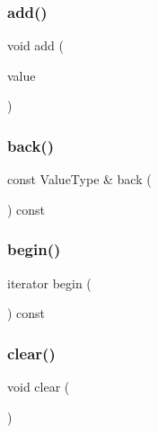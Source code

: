 \subsubsection{\texorpdfstring{add()}{add()}}
{\footnotesize\ttfamily void add (\begin{DoxyParamCaption}\item[{const Value\+Type \&}]{value }\end{DoxyParamCaption})}

\mbox{\label{classQueue_adc761c91bdacd01bed5c96e25fd9486a}} 
\subsubsection{\texorpdfstring{back()}{back()}}
{\footnotesize\ttfamily const Value\+Type \& back (\begin{DoxyParamCaption}{ }\end{DoxyParamCaption}) const}

\mbox{\label{classQueue_a0c62c15c8ed609e7e5e9518cf5f5c712}} 
\subsubsection{\texorpdfstring{begin()}{begin()}}
{\footnotesize\ttfamily iterator begin (\begin{DoxyParamCaption}{ }\end{DoxyParamCaption}) const\hspace{0.3cm}{\ttfamily [inline]}}

\mbox{\label{classQueue_ac8bb3912a3ce86b15842e79d0b421204}} 
\subsubsection{\texorpdfstring{clear()}{clear()}}
{\footnotesize\ttfamily void clear (\begin{DoxyParamCaption}{ }\end{DoxyParamCaption})}

\mbox{\label{classQueue_aaee07e371e2370e76e6c42bada727ba2}} 
